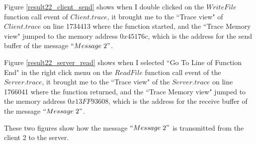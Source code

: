 Figure \ref{result22_client_send} shows when I double clicked on the $WriteFile$ function call event of $Client.trace$, it brought me to the ``Trace view" of $Client.trace$ on line 1734413 where the function started, and the ``Trace Memory view" jumped to the memory address $0x45176c$, which is the address for the send buffer of the message $``Message\; 2"$.

Figure \ref{result22_server_read} shows when I selected ``Go To Line of Function End" in the right click menu on the $ReadFile$ function call event of the $Server.trace$, it brought me to the ``Trace view" of the $Server.trace$ on line 1766041 where the function returned, and the ``Trace Memory view" jumped to the memory address $0x13FF93608$, which is the address for the receive buffer of the message $``Message\; 2"$.

These two figures show how the message $``Message\; 2"$ is transmitted from the client 2 to the server.


